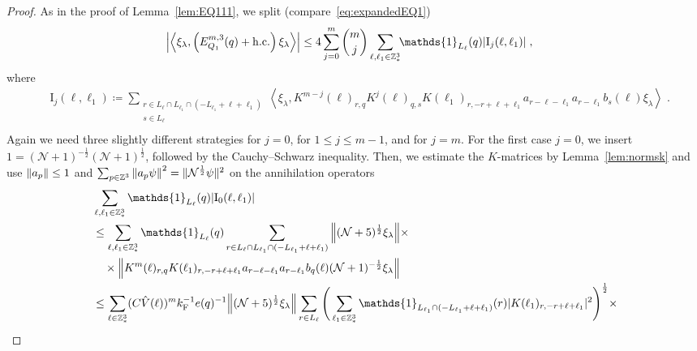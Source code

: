 \documentclass[12pt,a4paper]{article}
\numberwithin{equation}{section}
\newcommand{\cN}{\mathcal{N}}
\newcommand{\1}{\mathbb{I}}
\newcommand{\F}{\mathrm{F}}
\newcommand{\I}{\mathrm{I}}
\newcommand{\Z}{\mathbb{Z}}
\newcommand{\NN}{\mathcal{N}}
\newcommand{\half}{\frac{1}{2}}
\newcommand{\eva}[1]{\left\langle #1 \right\rangle}
\theoremstyle{plain}
\theoremstyle{definition}
\theoremstyle{remark}
\theoremstyle{plain}
\theoremstyle{definition}
\theoremstyle{remark}
\begin{document}
\begin{proof}
As in the proof of Lemma~\ref{lem:EQ111}, we split (compare~\eqref{eq:expandedEQ1})
\begin{equation} \label{eq:EQ1121}
\begin{aligned}
	& \abs{\eva{\xi_\lambda,\left(E^{m,3}_{Q_1}(q) +  \mathrm{h.c.}\right) \xi_\lambda }}
	\le 4 \sum_{j=0}^m {{m}\choose j} \sum_{\ell,\ell_1 \in \Z^3_*}\!\! \mathds{1}_{L_\ell}(q) |\I_j(\ell, \ell_1)| \;,
	\end{aligned}
\end{equation}
where
\begin{equation}
\begin{aligned}
	& \I_j(\ell, \ell_1)
	\coloneq \sum_{\substack{r\in L_{\ell} \cap L_{\ell_1} \cap (-L_{\ell_1}+\ell+\ell_1)\\ s \in L_{\ell}}}
		\eva{\xi_\lambda, K^{m-j}(\ell)_{r,q} K^{j}(\ell)_{q,s}K(\ell_1)_{r,-r+\ell+\ell_1} a_{r-\ell-\ell_1} a_{r-\ell_1} b_{s}(\ell) \xi_\lambda} \;. \\
\end{aligned}
\end{equation}
Again we need three slightly different strategies for $ j = 0 $, for $ 1 \le j \le m-1 $, and for $ j = m $. For the first case $ j = 0 $, we insert $1 = (\NN+1)^{-\half}(\NN+1)^{\half}$, followed by the Cauchy--Schwarz inequality. Then, we estimate the $ K $-matrices by Lemma~\ref{lem:normsk} and use $ \norm{a_p} \le 1 $ and $ \sum_{p \in \Z^3} \norm{a_p \psi}^2 = \Vert \cN^\half \psi \Vert^2 $ on the annihilation operators
\begin{align}
	&\sum_{\ell,\ell_1 \in \Z^3_*} \mathds{1}_{L_\ell}(q) |\I_0(\ell, \ell_1)| \nonumber\\
	&\leq \sum_{\ell,\ell_1 \in \Z^3_*} \mathds{1}_{L_\ell}(q) \sum\limits_{\substack{r\in L_{\ell} \cap L_{\ell_1} \cap (-L_{\ell_1}+\ell+\ell_1)}}
		\norm{ (\NN+5)^{\half} \xi_\lambda} \times \nonumber\\
	&\quad \times \norm{ K^m(\ell )_{r,q} K(\ell_1)_{r,-r+\ell+\ell_1} a_{r-\ell-\ell_1} a_{r-\ell_1} b_{q}(\ell) (\NN+1)^{-\half} \xi_\lambda }\nonumber\\
	 &\leq \sum_{\ell \in \Z^3_*} (C \hat{V}(\ell))^m k_{\F}^{-1} e(q)^{-1}
	 	\norm{ (\NN+5)^{\half} \xi_\lambda}
	 	\sum_{r \in L_\ell} \Bigg( \sum_{\ell_1 \in \Z^3_*} \mathds{1}_{L_{\ell_1} \cap (-L_{\ell_1}+\ell+\ell_1)}(r) |K(\ell_1)_{r,-r+\ell+\ell_1}|^2 \Bigg)^{\half} \times \nonumber\\

\end{align}
\end{proof}
\end{document}
